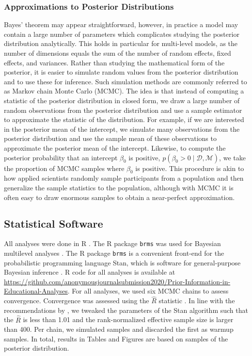 \documentclass[man, mask]{apa7}
\newcommand{\getValInt}[3]{%
	\pgfplotstablegetelem{#1}{#2}\of{#3}%
	\pgfmathprintnumber[fixed, fixed zerofill=false]{\pgfplotsretval}%
}
\newcommand{\code}[1]{\texttt{#1}}
\newcommand{\prob}[1]{p\left(#1\right)}
\newcommand{\data}{\mathcal{D}}
\newcommand{\model}{\mathcal{M}}
\newcommand{\githubLink}{\url{https://github.com/anonymousjournalsubmission2020/Prior-Information-in-Educational-Analyses}}
\begin{document}
\subsubsection{Approximations to Posterior Distributions}
Bayes' theorem may appear straightforward, however, in practice a model may contain a large number of parameters which complicates studying the posterior distribution analytically. 
This holds in particular for multi-level models, as the number of dimensions equals the sum of the number of random effects, fixed effects, and variances.
Rather than studying the mathematical form of the posterior, it is easier to simulate random values from the posterior distribution and to use these for inference.
Such simulation methods are commonly referred to as Markov chain Monte Carlo (MCMC).
The idea is that instead of computing a statistic of the posterior distribution in closed form, we draw a large number of random observations from the posterior distribution and use a sample estimator to approximate the statistic of the distribution.
For example, if we are interested in the posterior mean of the intercept, we simulate many observations from the posterior distribution and use the sample mean of these observations to approximate the posterior mean of the intercept.
Likewise, to compute the posterior probability that an intercept $\beta_0$ is positive, $\prob{\beta_0 > 0 \mid \data , \model}$, we take the proportion of MCMC samples where $\beta_0$ is positive.
This procedure is akin to how applied scientists randomly sample participants from a population and then generalize the sample statistics to the population, although with MCMC it is often easy to draw enormous samples to obtain a near-perfect approximation.

\subsection{Statistical Software}

All analyses were done in R \parencite{R}.
The R package \code{brms} was used for Bayesian multilevel analyses \parencite{burkner2017brms}.
The R package \code{brms} is a convenient front-end for the probabilistic programming language Stan, which is software for general-purpose Bayesian inference \parencite{carpenter2017stan}.
R code for all analyses is available at \githubLink{}.
For all analyses, we used six MCMC chains to assess convergence.
Convergence was assessed using the $\widehat{R}$ statistic \parencite{vehtari2019rank}.
In line with the recommendations by \textcite{vehtari2019rank}, we tweaked the parameters of the Stan algorithm such that the $\widehat{R}$ is less than 1.01 and the rank-normalized effective sample size is larger than 400.
Per chain, we simulated \getValInt{0}{iter}{\tbMCMCsettings} samples and discarded the first \getValInt{0}{warmup}{\tbMCMCsettings} as warmup samples.
In total, results in Tables and Figures are based on \getValInt{0}{total}{\tbMCMCsettings} samples of the posterior distribution.
\end{document}
